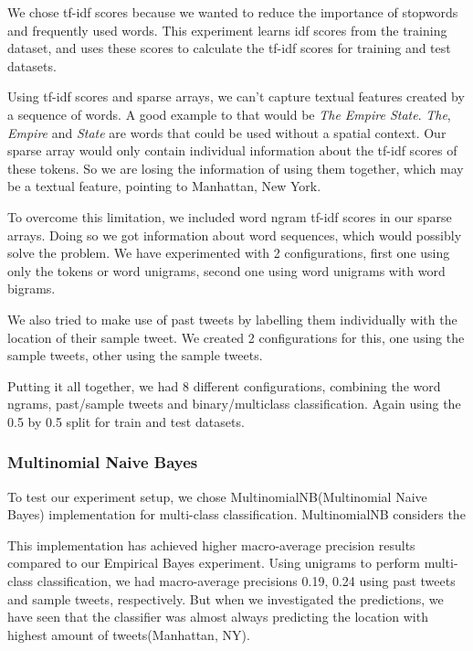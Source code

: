 \documentclass[twoside,11pt]{article}
\begin{document}
We chose tf-idf scores because we wanted to reduce the importance of stopwords and frequently used words. This experiment learns idf scores from the training dataset, and uses these scores to calculate the tf-idf scores for training and test datasets. 

Using tf-idf scores and sparse arrays, we can't capture textual features created by a sequence of words. A good example to that would be \textit{The Empire State}. \textit{The}, \textit{Empire} and \textit{State} are words that could be used without a spatial context. Our sparse array would only contain individual information about the tf-idf scores of these tokens. So we are losing the information of using them together, which may be a textual feature, pointing to Manhattan, New York.

To overcome this limitation, we included word ngram tf-idf scores in our sparse arrays. Doing so we got information about word sequences, which would possibly solve the problem. We have experimented with 2 configurations, first one using only the tokens or word unigrams, second one using  word unigrams with word bigrams. 

We also tried to make use of past tweets by labelling them individually with the location of their sample tweet. We created 2 configurations for this, one using the sample tweets, other using the sample tweets.

Putting it all together, we had 8 different configurations, combining the word ngrams, past/sample tweets and binary/multiclass classification. Again using the 0.5 by 0.5 split for train and test datasets.

\subsubsection{Multinomial Naive Bayes}

To test our experiment setup, we chose MultinomialNB(Multinomial Naive Bayes) implementation for multi-class classification. MultinomialNB considers the 

This implementation has achieved higher macro-average precision results compared to our Empirical Bayes experiment. Using unigrams to perform multi-class classification, we had macro-average precisions 0.19, 0.24 using past tweets and sample tweets, respectively. But when we investigated the predictions, we have seen that the classifier was almost always predicting the location with highest amount of tweets(Manhattan, NY).
\end{document}
